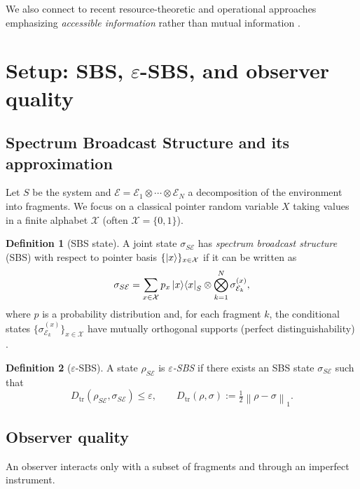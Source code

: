 \documentclass[11pt]{article}
\newcommand{\cE}{\mathcal{E}}
\newcommand{\cX}{\mathcal{X}}
\newcommand{\Dtr}{D_{\mathrm{tr}}}
\newcommand{\normone}[1]{\left\lVert #1\right\rVert_{1}}
\newcommand{\1}{\mathbf{1}}
\theoremstyle{definition}
\newtheorem{definition}{Definition}
\theoremstyle{plain}
\begin{document}
We also connect to recent resource-theoretic and operational approaches emphasizing \emph{accessible information} rather than mutual information \citep{Touil2022}.

\section{Setup: SBS, $\varepsilon$-SBS, and observer quality}

\subsection{Spectrum Broadcast Structure and its approximation}

Let $S$ be the system and $\cE=\cE_1\otimes\cdots\otimes\cE_N$ a decomposition of the environment into fragments.
We focus on a classical pointer random variable $X$ taking values in a finite alphabet $\cX$ (often $\cX=\{0,1\}$).

\begin{definition}[SBS state]
A joint state $\sigma_{S\cE}$ has \emph{spectrum broadcast structure} (SBS) with respect to pointer basis $\{\ket{x}\}_{x\in\cX}$ if it can be written as
\begin{equation}
\sigma_{S\cE}=\sum_{x\in\cX} p_x \ket{x}\!\bra{x}_S \otimes \bigotimes_{k=1}^N \sigma^{(x)}_{\cE_k},
\label{eq:sbs}
\end{equation}
where $p$ is a probability distribution and, for each fragment $k$, the conditional states $\{\sigma^{(x)}_{\cE_k}\}_{x\in\cX}$ have mutually orthogonal supports (perfect distinguishability) \citep{HorodeckiKorbiczHorodecki2015,KorbiczReview2021}.
\end{definition}

\begin{definition}[$\varepsilon$-SBS]
A state $\rho_{S\cE}$ is \emph{$\varepsilon$-SBS} if there exists an SBS state $\sigma_{S\cE}$ such that
\[
\Dtr(\rho_{S\cE},\sigma_{S\cE})\le \varepsilon,
\qquad
\Dtr(\rho,\sigma):=\tfrac12\normone{\rho-\sigma}.
\]
\end{definition}

\subsection{Observer quality}

An observer interacts only with a subset of fragments and through an imperfect instrument.
\end{document}
